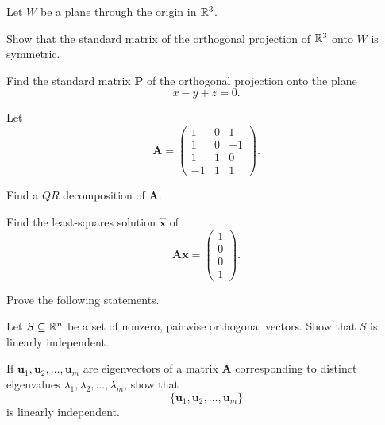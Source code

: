 \documentclass[11pt,oneside]{article}
\begin{document}
\begin{problem}
Let $W$ be a plane through the origin in $\mathbb{R}^3$.
\begin{problemsubparts}
\item Show that the standard matrix of the orthogonal projection of $\mathbb{R}^3$ onto $W$ is symmetric.
\item Find the standard matrix $\mathbf P$ of the orthogonal projection onto the plane
\[
x-y+z=0.
\]
\end{problemsubparts}
\end{problem}

\begin{problem}
Let
\[
\mathbf A=
\begin{pmatrix}
1&0&1\\
1&0&-1\\
1&1&0\\
-1&1&1
\end{pmatrix}.
\]
\begin{problemsubparts}
\item Find a $QR$ decomposition of $\mathbf A$.
\item Find the least-squares solution $\widehat{\mathbf x}$ of
\[
\mathbf A\mathbf x=
\begin{pmatrix}
1\\0\\0\\1
\end{pmatrix}.
\]
\end{problemsubparts}
\end{problem}

\begin{problem}
Prove the following statements.
\begin{problemsubparts}
\item Let $S\subseteq\mathbb{R}^n$ be a set of nonzero, pairwise orthogonal vectors. Show that $S$ is linearly independent.
\item If $\mathbf u_1,\mathbf u_2,\dots,\mathbf u_m$ are eigenvectors of a matrix $\mathbf A$ corresponding to distinct eigenvalues $\lambda_1,\lambda_2,\dots,\lambda_m$, show that
\[
\{\mathbf u_1,\mathbf u_2,\dots,\mathbf u_m\}
\]
is linearly independent.
\end{problemsubparts}
\end{problem}
\end{document}
